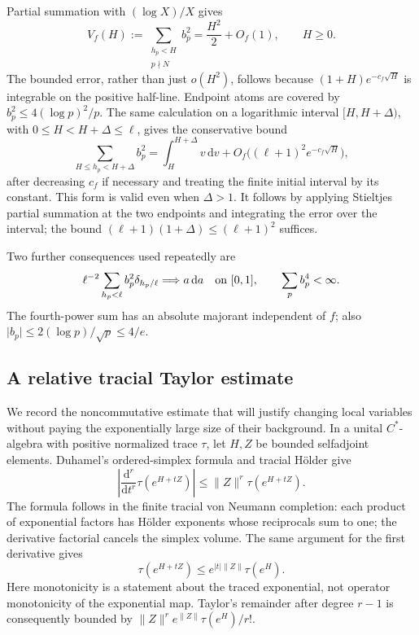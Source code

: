 \documentclass[11pt,reqno]{amsart}
\numberwithin{equation}{section}
\newcommand{\dd}{\,\mathrm d}
\newcommand{\norm}[1]{\lVert#1\rVert}
\newcommand{\abs}[1]{\lvert#1\rvert}
\begin{document}
Partial summation with $(\log X)/X$ gives
\begin{equation}\label{eq:variance}
 V_f(H):=\sum_{\substack{h_p<H\\p\nmid N}}b_p^2
       =\frac{H^2}{2}+O_f(1),\qquad H\ge0.
\end{equation}
The bounded error, rather than just $o(H^2)$, follows because
$(1+H)e^{-c_f\sqrt H}$ is integrable on the positive half-line.
Endpoint atoms are covered by $b_p^2\le4(\log p)^2/p$.
The same calculation on a logarithmic interval $[H,H+\Delta)$,
with $0\le H<H+\Delta\le\ell$, gives the conservative bound
\begin{equation}\label{eq:bin}
 \sum_{H\le h_p<H+\Delta}b_p^2
 =\int_H^{H+\Delta}v\dd v
   +O_f\bigl((\ell+1)^2e^{-c_f\sqrt H}\bigr),
\end{equation}
after decreasing $c_f$ if necessary and treating the finite initial
interval by its constant. This form is valid even when $\Delta>1$.
It follows by applying Stieltjes partial summation at the two
endpoints and integrating the error over the interval; the bound
$(\ell+1)(1+\Delta)\le(\ell+1)^2$ suffices.

Two further consequences used repeatedly are
\begin{equation}\label{eq:variance-measure}
 \ell^{-2}\sum_{h_p<\ell}b_p^2\delta_{h_p/\ell}
       \Longrightarrow a\dd a\quad\hbox{on }[0,1],
 \qquad \sum_p b_p^4<\infty.
\end{equation}
The fourth-power sum has an absolute majorant independent of $f$;
also $\abs{b_p}\le2(\log p)/\sqrt p\le4/e$.

\subsection*{A relative tracial Taylor estimate}

We record the noncommutative estimate that will justify changing
local variables without paying the exponentially large size of
their background. In a unital $C^*$-algebra with positive normalized
trace $\tau$, let $H,Z$ be bounded selfadjoint elements. Duhamel's
ordered-simplex formula and tracial H\"older give
\begin{equation}\label{eq:duhamel-bound}
 \left|\frac{\mathrm d^r}{\mathrm dt^r}
          \tau(e^{H+tZ})\right|
 \le\norm Z^r\tau(e^{H+tZ}).
\end{equation}
The formula follows in the finite tracial von Neumann completion:
each product of exponential factors has H\"older exponents whose
reciprocals sum to one; the derivative factorial cancels the
simplex volume. The same argument for the first derivative gives
\[
 \tau(e^{H+tZ})\le e^{\abs t\norm Z}\tau(e^H).
\]
Here monotonicity is a statement about the traced exponential,
not operator monotonicity of the exponential map. Taylor's
remainder after degree $r-1$ is consequently bounded by
$\norm Z^r e^{\norm Z}\tau(e^H)/r!$.
\end{document}
